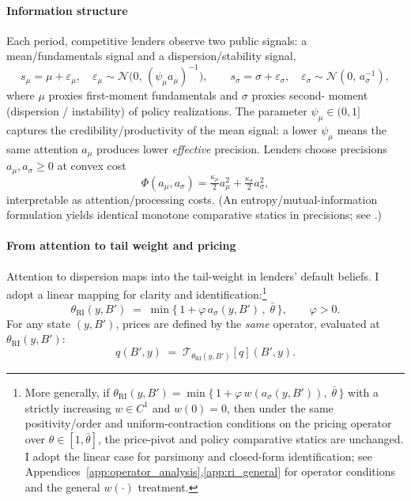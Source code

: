 \documentclass[12pt]{article}
\theoremstyle{plain}
\begin{document}
\paragraph{Information structure}
Each period, competitive lenders observe two public signals: a
mean/fundamentals signal and a dispersion/stability signal,
\[
	s_\mu = \mu + \varepsilon_\mu,\quad \varepsilon_\mu\sim \mathcal N\bigl(0,\,(\psi_\mu a_\mu)^{-1}\bigr),\qquad
	s_\sigma = \sigma + \varepsilon_\sigma,\quad \varepsilon_\sigma\sim \mathcal N(0,\,a_\sigma^{-1}),
\]
where $\mu$ proxies first-moment fundamentals and $\sigma$ proxies second-
moment (dispersion / instability) of policy realizations. The parameter
$\psi_\mu\in(0,1]$ captures the credibility/productivity of the mean signal: a
lower $\psi_\mu$ means the same attention $a_\mu$ produces lower
\emph{effective} precision. Lenders choose precisions $a_\mu,a_\sigma\ge0$ at
convex cost
\begin{equation}
	\Phi(a_\mu,a_\sigma) = \tfrac{\kappa_\mu}{2}a_\mu^2 + \tfrac{\kappa_\sigma}{2}a_\sigma^2,
	\label{eq:info_cost_micro}
\end{equation}
interpretable as attention/processing costs. (An entropy/mutual-information
formulation yields identical monotone comparative statics in precisions; see \citet{Sims2003, MackowiakWiederholt2009, MatejkaMcKay2015, Veldkamp2011}.)

\paragraph{From attention to tail weight and pricing}
Attention to dispersion maps into the tail-weight in lenders' default beliefs.
I adopt a linear mapping for clarity and identification:\footnote{More
	generally, if \(\theta_{\mathrm{RI}}(y,B')=\min\{\,1+\varphi\,
	w(a_\sigma(y,B'))\!,\;\bar\theta\,\}\) with a strictly increasing \(w\in C^1\)
	and \(w(0)=0\), then under the same positivity/order and uniform-contraction
	conditions on the pricing operator over \(\theta\in[1,\bar\theta]\), the
	price-pivot and policy comparative statics are unchanged. I adopt the linear
	case for parsimony and closed-form identification; see
	Appendices~\ref{app:operator_analysis},\ref{app:ri_general} for operator
	conditions and the general $w(\cdot)$ treatment.}
\begin{equation}
	\theta_{\mathrm{RI}}(y,B') \;=\; \min\Big\{\,1 + \varphi\, a_\sigma(y,B')\,,\; \bar\theta\,\Big\},\qquad \varphi>0.
	\label{eq:theta_RI_micro}
\end{equation}
For any state $(y,B')$, prices are defined by the \emph{same} operator,
evaluated at $\theta_{\mathrm{RI}}(y,B')$:
\begin{equation}
	q(B',y) \;=\; \mathcal T_{\theta_{\mathrm{RI}}(y,B')}[q](B',y).
	\label{eq:pricing_same_operator_micro}
\end{equation}
\end{document}
